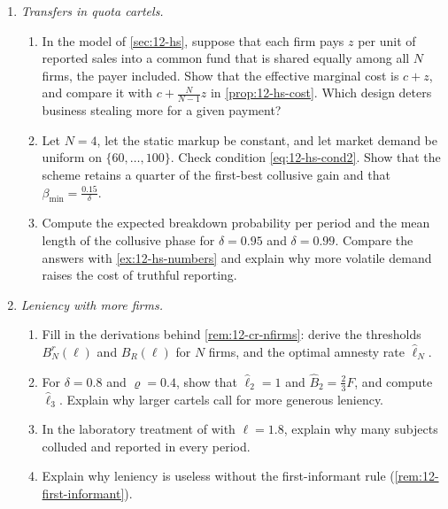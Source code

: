 \begin{enumerate}[label=\arabic*., leftmargin=*, itemsep=6pt]
\item \textit{Transfers in quota cartels.}
\begin{enumerate}[label=(\alph*)]
  \item In the model of \cref{sec:12-hs}, suppose that each firm pays $z$ per unit of reported sales into a common
  fund that is shared equally among all $N$ firms, the payer included. Show that the effective marginal cost is
  $c + z$, and compare it with $c + \frac{N}{N-1}z$ in \cref{prop:12-hs-cost}. Which design deters business stealing
  more for a given payment?
  \item Let $N = 4$, let the static markup be constant, and let market demand be uniform on $\{60, \dots, 100\}$.
  Check condition \eqref{eq:12-hs-cond2}. Show that the scheme retains a quarter of the first-best collusive gain
  and that $\beta_{\min} = \frac{0.15}{\delta}$.
  \item Compute the expected breakdown probability per period and the mean length of the collusive phase for
  $\delta = 0.95$ and $\delta = 0.99$. Compare the answers with \cref{ex:12-hs-numbers} and explain why more
  volatile demand raises the cost of truthful reporting.
\end{enumerate}

\item \textit{Leniency with more firms.}
\begin{enumerate}[label=(\alph*)]
  \item Fill in the derivations behind \cref{rem:12-cr-nfirms}: derive the thresholds $B_N^r(\ell)$ and
  $B_R(\ell)$ for $N$ firms, and the optimal amnesty rate $\hat\ell_N$.
  \item For $\delta = 0.8$ and $\varrho = 0.4$, show that $\hat\ell_2 = 1$ and $\hat B_2 = \frac{2}{3}F$, and
  compute $\hat\ell_3$. Explain why larger cartels call for more generous leniency.
  \item In the laboratory treatment of \citet{HinloopenSoetevent2008} with $\ell = 1.8$, explain why many subjects
  colluded and reported in every period.
  \item Explain why leniency is useless without the first-informant rule (\cref{rem:12-first-informant}).
\end{enumerate}

\end{enumerate}
